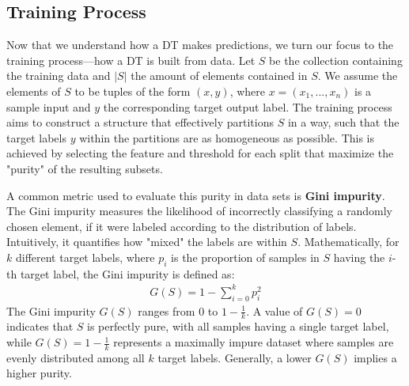 \subsection{Training Process}
\label{sec:dt_training}
Now that we understand how a DT makes predictions,
we turn our focus to the training process—how a DT is built from data.
Let $S$ be the collection containing the training data
and $|S|$ the amount of elements contained in $S$.
We assume the elements of $S$ to be tuples of the form $(x, y)$,
where $x = (x_1, ..., x_n)$ is a sample input and $y$ the corresponding target output label.
The training process aims to construct a structure that effectively partitions $S$ in a way,
such that the target labels $y$ within the partitions are as homogeneous as possible.
This is achieved by selecting the feature
and threshold for each split that maximize the "purity" of the resulting subsets.

A common metric used to evaluate this purity in data sets is \textbf{Gini impurity}.
The Gini impurity measures the likelihood of incorrectly classifying
a randomly chosen element, if it were labeled according to the distribution of labels.
Intuitively, it quantifies how "mixed" the labels are within $S$.
Mathematically, for $k$ different target labels,
where $p_i$ is the proportion of samples in $S$ having the $i$-th target label,
the Gini impurity is defined as:
\begin{align}
  G(S) = 1 - \sum_{i=0}^{k}p_i^2
\end{align}
The Gini impurity $G(S)$ ranges from $0$ to $1 - \frac{1}{k}$.
A value of $G(S) = 0$ indicates that $S$ is perfectly pure,
with all samples having a single target label,
while $G(S) = 1 - \frac{1}{k}$ represents a maximally impure dataset
where samples are evenly distributed among all $k$ target labels.
Generally, a lower $G(S)$ implies a higher purity.
\cite{gini}

